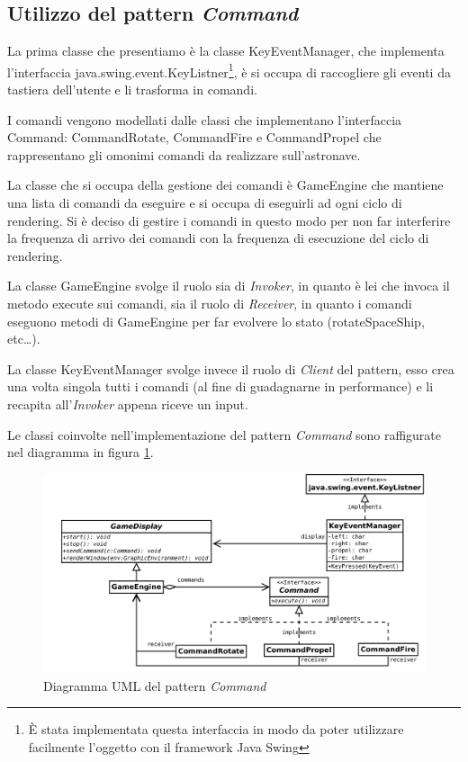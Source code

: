 \documentclass[a4paper,12pt]{article}
\begin{document}
\subsection{Utilizzo del pattern \emph{Command}}

La prima classe che presentiamo \`e la classe \textsf{KeyEventManager}, che implementa l'interfaccia \textsf{java.swing.event.KeyListner}\footnote{\`E stata implementata questa interfaccia in modo da poter utilizzare facilmente l'oggetto con il framework Java Swing}, \`e si occupa di raccogliere gli eventi da tastiera dell'utente e li trasforma in comandi.

I comandi vengono modellati dalle classi che implementano l'interfaccia \textsf{Command}: \textsf{CommandRotate}, \textsf{CommandFire} e \textsf{CommandPropel} che rappresentano gli omonimi comandi da realizzare sull'astronave.

La classe che si occupa della gestione dei comandi \`e \textsf{GameEngine} che mantiene una lista di comandi da eseguire e si occupa di eseguirli ad ogni ciclo di rendering. Si \`e deciso di gestire i comandi in questo modo per non far interferire la frequenza di arrivo dei comandi con la frequenza di esecuzione del ciclo di rendering.

La classe \textsf{GameEngine} svolge il ruolo sia di \emph{Invoker}, in quanto \`e lei che invoca il metodo \textsf{execute} sui comandi, sia il ruolo di \emph{Receiver}, in quanto i comandi eseguono metodi di \textsf{GameEngine} per far evolvere lo stato (\textsf{rotateSpaceShip}, etc\dots{}).

La classe \textsf{KeyEventManager} svolge invece il ruolo di \emph{Client} del pattern, esso crea una volta singola tutti i comandi (al fine di guadagnarne in performance) e li recapita all'\emph{Invoker} appena riceve un input.

Le classi coinvolte nell'implementazione del pattern \emph{Command} sono raffigurate nel diagramma in figura \ref{img:Command}.

\begin{figure}[h]
\centering
\includegraphics[width=15cm]{Command.pdf}
\caption{Diagramma UML del pattern \emph{Command}}
\label{img:Command}
\end{figure}
\end{document}
